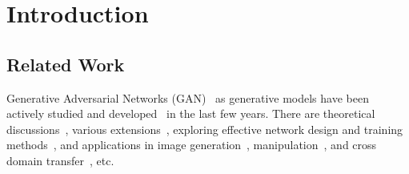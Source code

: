 \section{Introduction} \label{sec:intro}

\subsection{Related Work}

Generative Adversarial Networks (GAN)~\cite{goodfellow2014generative}
as generative models have been actively studied
and developed~\cite{chen2016infogan,nowozin2016f,
arjovsky2017wasserstein,zhao2016energy,radford2015unsupervised,
mescheder2017adversarial,mirza2014conditional,gauthier2014conditional,
odena2016conditional,denton2015deep,reed2016generative,
huang2016stacked,zhang2016stackgan,kim2017learning,zhu2017unpaired,
che2016mode,donahue2016adversarial,salimans2016improved,zhu2016generative}
in the last few years.
There are theoretical discussions~\cite{arjovsky2017wasserstein,
zhao2016energy,nowozin2016f},
various extensions~\cite{chen2016infogan,che2016mode,donahue2016adversarial,
salimans2016improved,mescheder2017adversarial,mirza2014conditional,
gauthier2014conditional,huang2016stacked},
exploring effective network design and
training methods~\cite{radford2015unsupervised},
and applications in image generation~\cite{odena2016conditional,denton2015deep,
reed2016generative,zhang2016stackgan},
manipulation~\cite{zhu2016generative},
and cross domain transfer~\cite{kim2017learning,zhu2017unpaired}, etc.
